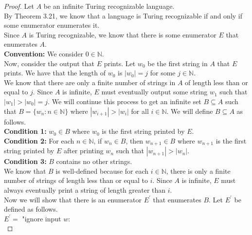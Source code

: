 \documentclass[12pt]{article}
\newcommand{\N}{\mathbb{N}}
\begin{document}
\begin{proof}
Let $A$ be an infinite Turing recognizable language. \\

By Theorem 3.21, we know that a language is Turing recognizable if and only if some enumerator enumerates it. \\

Since $A$ is Turing recognizable, we know that there is some enumerator $E$ that enumerates $A$. \\

\textbf{Convention:} We consider $0 \in \N$. \\

Now, consider the output that $E$ prints. Let $w_0$ be the first string in $A$ that $E$ prints. We have that the length of $w_0$ is $|w_0| = j$ for some $j \in \N$. \\

We know that there are only a finite number of strings in $A$ of length less than or equal to $j$. Since $A$ is infinite, $E$ must eventually output some string $w_1$ such that $|w_1| > |w_0| = j$. We will continue this process to get an infinite set $B \subseteq A$ such that $B = \{w_n: n \in \N\}$ where $|w_{i+1}| > |w_i|$ for all $i \in \N$. We will define $B \subseteq A$ as follows. \\

\textbf{Condition 1:} $w_0 \in B$ where $w_0$ is the first string printed by $E$. \\

\textbf{Condition 2:} For each $n \in \N$, if $w_n \in B$, then $w_{n+1} \in B$ where $w_{n+1}$ is the first string printed by $E$ after printing $w_n$ such that $|w_{n+1}| > |w_n|$. \\

\textbf{Condition 3:} $B$ contains no other strings. \\

We know that $B$ is well-defined because for each $i \in \N$, there is only a finite number of strings of length less than or equal to $i$. Since $A$ is infinite, $E$ must always eventually print a string of length greater than $i$. \\

Now we will show that there is an enumerator $E^\prime$ that enumerates $B$. Let $E^\prime$ be defined as follows. \\

$E^\prime = $ "ignore input $w$: \\


\end{proof}
\end{document}
